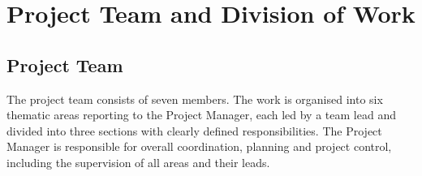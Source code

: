 \clearpage

\chapter*{Project Team and Division of Work}

\section*{Project Team}

The project team consists of seven members. The work is organised into six thematic
areas reporting to the Project Manager, each led by a team lead and divided into
three sections with clearly defined responsibilities. The Project Manager is
responsible for overall coordination, planning and project control, including the
supervision of all areas and their leads.

\setlength{\LTleft}{0pt}
\setlength{\LTright}{0pt}

\renewcommand{\arraystretch}{1.3}

